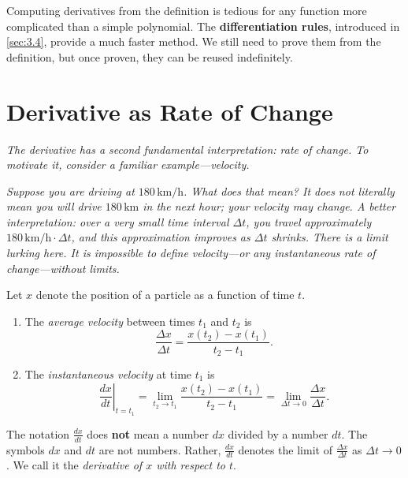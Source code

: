 \begin{remark}
Computing derivatives from the definition is tedious for any function more complicated than a simple polynomial.  The \textbf{differentiation rules}, introduced in \cref{sec:3.4}, provide a much faster method.  We still need to prove them from the definition, but once proven, they can be reused indefinitely.
\end{remark}

\section{Derivative as Rate of Change}
\label{sec:3.3}

\textit{The derivative has a second fundamental interpretation: rate of change.  To motivate it, consider a familiar example---velocity.}

\textit{Suppose you are driving at $180\,\text{km/h}$.  What does that mean?  It does not literally mean you will drive $180\,\text{km}$ in the next hour; your velocity may change.  A better interpretation: over a very small time interval $\Delta t$, you travel approximately $180\,\text{km/h}\cdot\Delta t$, and this approximation improves as $\Delta t$ shrinks.  There is a limit lurking here.  It is impossible to define velocity---or any instantaneous rate of change---without limits.}

\begin{definition}
\label{def:3-4}
Let $x$ denote the position of a particle as a function of time $t$.
\begin{enumerate}[label=(\roman*)]
  \item The \emph{average velocity} between times $t_{1}$ and $t_{2}$ is
  \[
    \dfrac{\Delta x}{\Delta t} = \dfrac{x(t_{2}) - x(t_{1})}{t_{2} - t_{1}}.
  \]
  \item The \emph{instantaneous velocity} at time $t_{1}$ is
  \[
    \left.\dfrac{dx}{dt}\right|_{t=t_{1}} = \lim_{t_{2} \to t_{1}} \dfrac{x(t_{2}) - x(t_{1})}{t_{2} - t_{1}} = \lim_{\Delta t \to 0} \dfrac{\Delta x}{\Delta t}.
  \]
\end{enumerate}
\end{definition}

\begin{remark}[Warning]
The notation $\frac{dx}{dt}$ does \textbf{not} mean a number $dx$ divided by a number $dt$.  The symbols $dx$ and $dt$ are not numbers.  Rather, $\frac{dx}{dt}$ denotes the limit of $\frac{\Delta x}{\Delta t}$ as $\Delta t \to 0$.  We call it the \emph{derivative of $x$ with respect to $t$}.
\end{remark}

